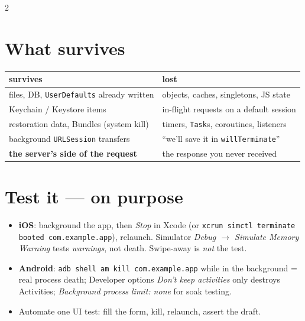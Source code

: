 \documentclass[8pt]{extarticle}
\newcommand\ct[1]{\texttt{#1}}
\begin{document}
\begin{multicols}{2}
\section{What survives}
{\footnotesize\setlength{\tabcolsep}{3pt}
\begin{tabular}{@{}>{\raggedright\arraybackslash}p{36mm}>{\raggedright\arraybackslash}p{39mm}@{}}
\toprule
\textcolor{sheetGreen!55!black}{\textbf{survives}} & \textcolor{sheetRed}{\textbf{lost}}\\ \midrule
files, DB, \ct{UserDefaults} already written & objects, caches, singletons, JS state\\
Keychain / Keystore items & in-flight requests on a default session\\
restoration data, Bundles (system kill) & timers, \ct{Task}s, coroutines, listeners\\
background \ct{URLSession} transfers & ``we'll save it in \ct{willTerminate}''\\
\textbf{the server's side of the request} & the response you never received\\
\bottomrule
\end{tabular}}

\section{Test it — on purpose}
\begin{itemize}
  \item \textbf{iOS}: background the app, then \emph{Stop} in Xcode (or
        \ct{xcrun simctl terminate booted com.example.app}), relaunch.
        Simulator \emph{Debug $\to$ Simulate Memory Warning} tests
        \emph{warnings}, not death. Swipe-away is \emph{not} the test.
  \item \textbf{Android}: \ct{adb shell am kill com.example.app} while in the
        background = real process death; Developer options \emph{Don't keep
        activities} only destroys Activities; \emph{Background process limit:
        none} for soak testing.
  \item Automate one UI test: fill the form, kill, relaunch, assert the draft.
\end{itemize}


\end{multicols}
\end{document}
